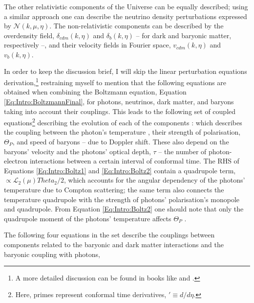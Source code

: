\qquad The other relativistic components of the Universe can be equally described; using a similar approach one can describe the neutrino density perturbations expressed by $\mathcal{N}(k,\mu,\eta)$. The non-relativistic components can be described by the overdensity field, $\delta_{cdm}(k,\eta)$ and $\delta_b(k,\eta)$ -- for dark and baryonic matter, respectively --, and their velocity fields in Fourier space, $v_{cdm}(k,\eta)$ and $v_{b}(k,\eta)$.  

\qquad In order to keep the discussion brief, I will skip the linear perturbation equations derivation,\footnote{A more detailed discussion can be found in books like \cite{padmanabhan_1999,Peacock} and \cite{dods}.} restraining myself to mention that the following equations are obtained when combining the Boltzmann equation, Equation \eqref{Eq:Intro:BoltzmannFinal}, for photons, neutrinos, dark matter, and baryons taking into account their couplings. This leads to the following set of coupled equations\footnote{Here, primes represent conformal time derivatives, $' \equiv d/d\eta$.} describing the evolution of each of the components \citep[][p. 100]{dods}:
which describes the coupling between the photon's temperature , their strength of polarisation, $\Theta_P$, and speed of baryons -- due to Doppler shift. These also depend on the baryons' velocity and the photons' optical depth, $\tau$ -- the number of photon-electron interactions between a certain interval of conformal time. The RHS of Equations \eqref{Eq:Intro:Boltz1} and \eqref{Eq:Intro:Boltz2} contain a quadrupole term, $\propto \mathcal{L}_2 (\mu)Theta_2/2$, which accounts for the angular dependency of the photons' temperature due to Compton scattering; the same term also connects the temperature quadrupole with the strength of photons' polarisation's monopole and quadrupole. From Equation \eqref{Eq:Intro:Boltz2} one should note that only the quadrupole moment of the photons' temperature affects $\Theta_P$ \citep[][p. 112]{dods}.

\qquad The following four equations in the set describe the couplings between components related to the baryonic and dark matter interactions and the baryonic coupling with photons, 

